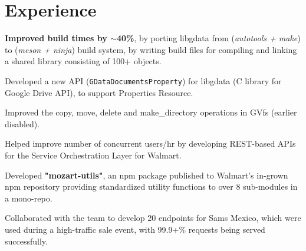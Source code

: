 \documentclass[a4paper]{deedy-resume-reversed}
\begin{document}
\begin{minipage}[t]{0.60\textwidth}


\section{Experience}
\vspace{10pt} %
\begin{tightemize}
    \item \textbf{Improved build times by $\sim$40\%}, by porting libgdata from (\textit{autotools + make}) to (\textit{meson + ninja}) build system, by writing build files for compiling and linking a shared library consisting of 100+ objects.
    \item Developed a new API (\texttt{GDataDocumentsProperty}) for libgdata (C library for Google Drive API), to support Properties Resource.
    \item Improved the copy, move, delete and make\_directory operations in GVfs (earlier disabled).
\end{tightemize}
\sectionsep

\begin{tightemize}
    \item Helped improve number of concurrent users/hr by developing REST-based APIs for the Service Orchestration Layer for Walmart.
    \item Developed \textbf{"mozart-utils"}, an npm package published to Walmart's in-grown npm repository providing standardized utility functions to over 8 sub-modules in a mono-repo.
    \item Collaborated with the team to develop 20 endpoints for Sams Mexico, which were used during a high-traffic sale event, with 99.9+\% requests being served successfully.
\end{tightemize}
\sectionsep


\end{minipage}
\end{document}
